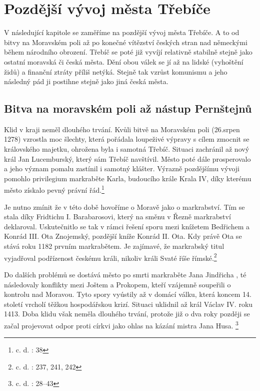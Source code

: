 \documentclass[a4paper,oneside,12p]{report}
\begin{document}
\chapter{Pozdější vývoj města Třebíče}

V následující kapitole se zaměříme na pozdější vývoj města Třebíče.
A to od bitvy na Moravském poli až po konečné vítězství českých stran nad německými během národního obrození.
Třebíč se poté již vyvíjí relativně stabilně stejně jako ostatní moravská či česká města.
Dění obou válek se jí až na lidské (vyhoštění židů) a finanční ztráty příliš netýká.
Stejně tak vzrůst komunismu a jeho následný pád ji postihne stejně jako jiná česká města.

\section{Bitva na moravském poli až nástup Pernštejnů}

Klid v kraji neměl dlouhého trvání.
Kvůli bitvě na Moravském poli (26.srpen 1278) vzrostla moc šlechty, která pořádala loupeživé výpravy s cílem zmocnit se královského majetku, ohrožena byla i samotná Třebíč.
Situaci zachránil až nový král Jan Lucemburský, který sám Třebíč navštívil.
Město poté dále prosperovalo a jeho význam pomalu zastínil i samotný klášter.
Výrazně pozdějšímu vývoji pomohlo privilegium markraběte Karla, budoucího krále Krala IV, díky kterému město získalo pevný právní řád.\footnote{c. d. : 38}

Je nutno zmínit že v této době hovoříme o Moravě jako o markrabství.
Tím se stala díky Fridtichu I. Barabarosovi, který na směnu v Řezně markrabství deklaroval.
Uskutečnitlo se tak v rámci řešení sporu mezi knížetem Bedřichem a Konrád III. Ota Znojemský, pozdější kníže Konrád II. Ota.
Kdy právě Ota se stává roku 1182 prvním markrabětem.
Je zajímavé, že markrabský titul vyjadřoval podřízenost českému králi, nikoliv králi Svaté říše římské.\footnote{c. d. : 237, 241, 242}

Do dalších problémů se dostává město po smrti markraběte Jana Jindřicha , té následovaly konflikty mezi Joštem a Prokopem, kteří vzájemně soupeřili o kontrolu nad Moravou.
Tyto spory vyústily až v domácí válku, která koncem 14. století vrcholí těžkou hospodářskou krizí.
Situaci uklidnil až král Václav IV. roku 1413.
Doba klidu však neměla dlouhého trvání, protože již o dva roky později se začal projevovat odpor proti církvi jako ohlas na kázání mistra Jana Husa. \footnote{c. d. : 28--43}
\end{document}
